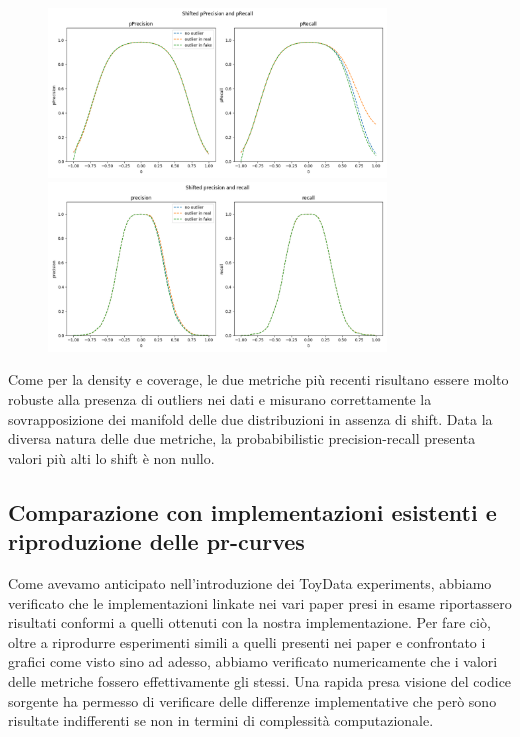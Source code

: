 \begin{figure}[!ht]
    \centering
    \includegraphics[width=0.8\textwidth]{../images/toyexperiments/outliers/shift_pPrecision_pRecall.png} 
    \includegraphics[width=0.8\textwidth]{../images/toyexperiments/outliers/shift_precision_recall.png} 
\end{figure}

Come per la density e coverage, le due metriche più recenti risultano essere molto robuste alla presenza di outliers nei dati e misurano correttamente la sovrapposizione dei manifold delle due distribuzioni in assenza di shift.
Data la diversa natura delle due metriche, la probabibilistic precision-recall presenta valori più alti lo shift è non nullo.

\subsection{Comparazione con implementazioni esistenti e riproduzione delle pr-curves}

Come avevamo anticipato nell'introduzione dei ToyData experiments, abbiamo verificato che le implementazioni linkate nei vari paper presi in esame riportassero risultati conformi a quelli ottenuti con la nostra implementazione.
Per fare ciò, oltre a riprodurre esperimenti simili a quelli presenti nei paper e confrontato i grafici come visto sino ad adesso, abbiamo verificato numericamente che i valori delle metriche fossero effettivamente gli stessi.
Una rapida presa visione del codice sorgente ha permesso di verificare delle differenze implementative che però sono risultate indifferenti se non in termini di complessità computazionale.

